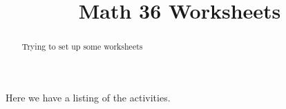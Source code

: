 \documentclass{xourse}
\title{Math 36 Worksheets}
\begin{document}
\begin{abstract} %
Trying to set up some worksheets
\end{abstract}
\maketitle
Here we have a listing of the activities.
\end{document}
